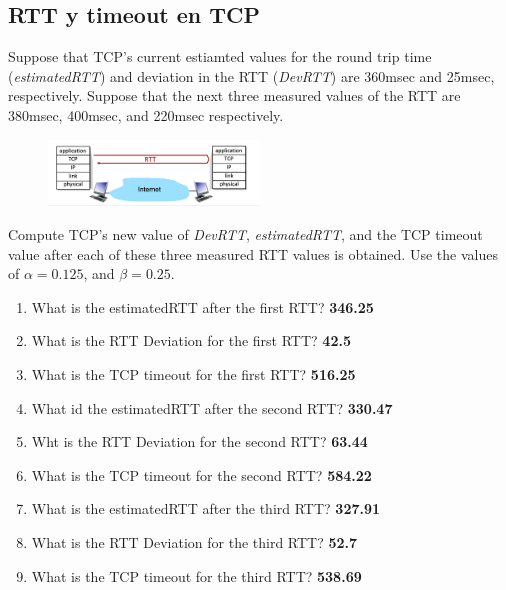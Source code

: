 \subsection*{RTT y timeout en TCP}
\noindent Suppose that TCP's current estiamted values for the round trip time (\textit{estimatedRTT}) and deviation in the RTT (\textit{DevRTT}) are 360msec and 25msec,
respectively. Suppose that the next three measured values of the RTT are 380msec, 400msec, and 220msec respectively.
\begin{figure}[H]
    \centering
    \includegraphics[width=0.5\textwidth]{img/TCP_RTT.png}
\end{figure}
\noindent Compute TCP's new value of \textit{DevRTT}, \textit{estimatedRTT}, and the TCP timeout value after each of these three measured RTT values is obtained. Use
the values of \( \alpha=0.125\), and \( \beta=0.25\).
\begin{enumerate}
    \item What is the estimatedRTT after the first RTT? \textbf{346.25}
    \item What is the RTT Deviation for the first RTT? \textbf{42.5}
    \item What is the TCP timeout for the first RTT? \textbf{516.25}
    \item What id the estimatedRTT after the second RTT? \textbf{330.47}
    \item Wht is the RTT Deviation for the second RTT? \textbf{63.44}
    \item What is the TCP timeout for the second RTT? \textbf{584.22}
    \item What is the estimatedRTT after the third RTT? \textbf{327.91}
    \item What is the RTT Deviation for the third RTT? \textbf{52.7}
    \item What is the TCP timeout for the third RTT? \textbf{538.69}
\end{enumerate} 

